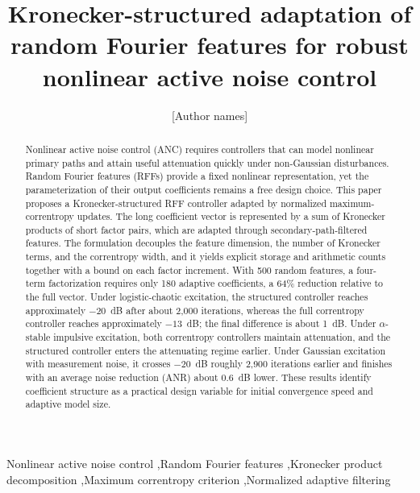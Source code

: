 \documentclass[preprint,12pt]{elsarticle}
\begin{document}
\begin{frontmatter}

\title{Kronecker-structured adaptation of random Fourier features for robust nonlinear active noise control}

\author{[Author names]}
\address{[Department, institution, city, postal code, country]}

\begin{abstract}
Nonlinear active noise control (ANC) requires controllers that can model nonlinear primary paths and attain useful attenuation quickly under non-Gaussian disturbances. Random Fourier features (RFFs) provide a fixed nonlinear representation, yet the parameterization of their output coefficients remains a free design choice. This paper proposes a Kronecker-structured RFF controller adapted by normalized maximum-correntropy updates. The long coefficient vector is represented by a sum of Kronecker products of short factor pairs, which are adapted through secondary-path-filtered features. The formulation decouples the feature dimension, the number of Kronecker terms, and the correntropy width, and it yields explicit storage and arithmetic counts together with a bound on each factor increment. With 500 random features, a four-term factorization requires only 180 adaptive coefficients, a 64\% reduction relative to the full vector. Under logistic-chaotic excitation, the structured controller reaches approximately $-20$~dB after about 2,000 iterations, whereas the full correntropy controller reaches approximately $-13$~dB; the final difference is about 1~dB. Under $\alpha$-stable impulsive excitation, both correntropy controllers maintain attenuation, and the structured controller enters the attenuating regime earlier. Under Gaussian excitation with measurement noise, it crosses $-20$~dB roughly 2,900 iterations earlier and finishes with an average noise reduction (ANR) about 0.6~dB lower. These results identify coefficient structure as a practical design variable for initial convergence speed and adaptive model size.
\end{abstract}

\begin{keyword}
Nonlinear active noise control \sep Random Fourier features \sep Kronecker product decomposition \sep Maximum correntropy criterion \sep Normalized adaptive filtering
\end{keyword}

\end{frontmatter}
\end{document}
